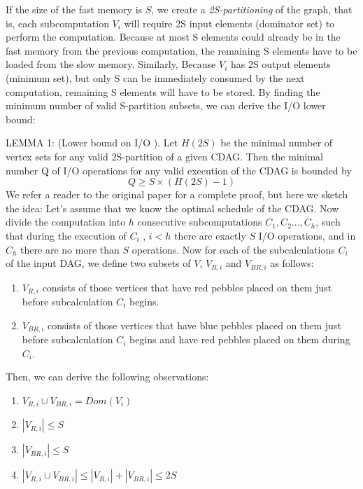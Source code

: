 \documentclass[sigconf]{acmart}
\begin{document}
	If the size of the fast memory is $S$, we create a \textit{2S-partitioning} 
	of the graph, that is, each subcomputation $V_i$ will require 2S input 
	elements (dominator set) to perform the computation. Because at most S 
	elements could already be in the fast memory from the previous computation, 
	the remaining S elements have to be loaded from the slow memory. Similarly, 
	Because $V_i$ has 2S output elements (minimum set), but only S can be 
	immediately consumed by the next computation, remaining S elements will 
	have to be stored. By finding the minimum number of 
	valid S-partition subsets, we can derive the I/O lower bound:
	
	LEMMA 1: (Lower bound on I/O \cite{redblue}). Let $H(2S)$ be the minimal 
	number of 
	vertex sets for any valid 2S-partition of a given CDAG. Then the minimal 
	number Q of I/O operations for any valid execution of the CDAG is bounded 
	by	
	\begin{equation}
	\label{eq:redbluebound}
	Q \ge S \times (H(2S) - 1)
	\end{equation}
		We refer a reader to the original paper for a complete proof, but here 
		we 
		sketch the idea: Let's assume that we know the optimal schedule of the 
		CDAG. Now divide the computation into $h$ consecutive subcomputations 
		$C_1, C_2..., C_h$, such that during the execution of $C_i$ , $i < h$ 
		there are exactly $S$ I/O operations, and in $C_h$ there are no more 
		than $S$ operations. Now for each of the subcalculations $C_i$ of the 
		input DAG, we define two 
		subsets 
		of $V$, $V_{R,i}$ and $V_{BR,i}$ as 
		follows:
		\begin{enumerate}
			\item $V_{R,i}$ consists of those vertices that have red pebbles 
			placed 
			on 
			them just before subcalculation $C_i$ begins.
			\item $V_{BR,i}$ consists of those vertices that have blue pebbles 
			placed 
			on them just before subcalculation $C_i$ begins and have red 
			pebbles 
			placed on them during $C_i$.
		\end{enumerate}
		
		Then, we can derive the following observations:
		\begin{enumerate}
			\item $V_{R,i} \cup V_{BR,i} = Dom(V_i)$
			\item $|V_{R,i}| \le S$
			\item $|V_{BR,i}| \le S$
			\item $|V_{R,i} \cup V_{BR,i}| \le |V_{R,i}| + |V_{BR,i}| \le 2S$
		\end{enumerate}
	
\end{document}
